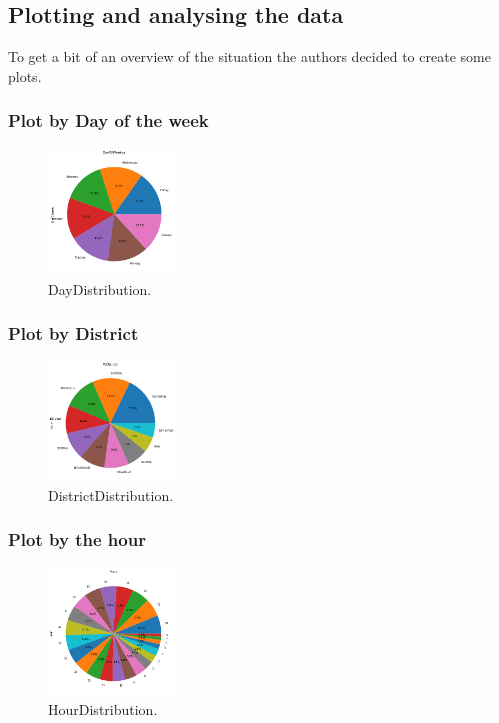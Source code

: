 \documentclass[../Main.tex]{subfiles}
\begin{document}
\subsection{Plotting and analysing the data}
To get a bit of an overview of the situation the authors decided to create some plots.
\subsubsection{Plot by Day of the week}
\begin{figure}[H]
\centering
\includegraphics[width=0.3\textwidth]{Resources/DayDistribution.png}
\caption{\label{fig:DayDistribution}DayDistribution.}
\end{figure}




\subsubsection{Plot by District}

\begin{figure}[H]
\centering
\includegraphics[width=0.3\textwidth]{Resources/DistrictDistribution.png}
\caption{\label{fig:DistrictDistribution}DistrictDistribution.}
\end{figure}

\subsubsection{Plot by the hour}

\begin{figure}[H]
\centering
\includegraphics[width=0.3\textwidth]{Resources/HourDistribution.png}
\caption{\label{fig:HourDistribution}HourDistribution.}
\end{figure}
\end{document}
